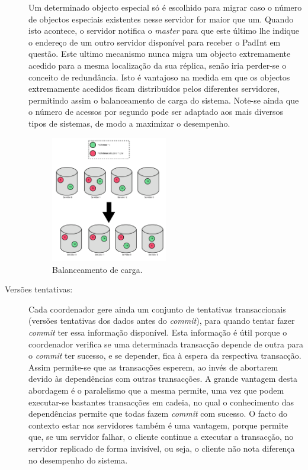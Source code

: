 \begin{description}
Um determinado objecto especial só é escolhido para migrar caso o número de objectos especiais existentes nesse servidor for maior que um. Quando isto acontece, o servidor notifica o \textit{master} para que este último lhe indique o endereço de um outro servidor disponível para receber o PadInt em questão. Este ultimo mecanismo nunca migra um objecto extremamente acedido para a mesma localização da sua réplica, senão iria perder-se o conceito de redundância. Isto é vantajoso na medida em que os objectos extremamente acedidos ficam distribuídos pelos diferentes servidores, permitindo assim o balanceamento de carga do sistema. Note-se ainda que o número de acessos por segundo pode ser adaptado aos mais diversos tipos de sistemas, de modo a maximizar o desempenho.

\begin{figure}[htb]
\centering
\includegraphics[width=0.5\textwidth]{migracao.png}
\caption{\label{fig:migracao}Balanceamento de carga.}
\end{figure}

\item[Versões tentativas:]
Cada coordenador gere ainda um conjunto de tentativas transaccionais (versões tentativas dos dados antes do \textit{commit}), para quando tentar fazer \textit{commit} ter essa informação disponível. Esta informação é útil porque o coordenador verifica se uma determinada transacção depende de outra para o \textit{commit} ter sucesso, e se depender, fica à espera da respectiva transacção. Assim permite-se que as transacções esperem, ao invés de abortarem devido às dependências com outras transacções. A grande vantagem desta abordagem é o paralelismo que a mesma permite, uma vez que podem executar-se bastantes transacções em cadeia, no qual o conhecimento das dependências permite que todas fazem \textit{commit} com sucesso. O facto do contexto estar nos servidores também é uma vantagem, porque permite que, se um servidor falhar, o cliente continue a executar a transacção, no servidor replicado de forma invisível, ou seja, o cliente não nota diferença no desempenho do sistema. 

\end{description}